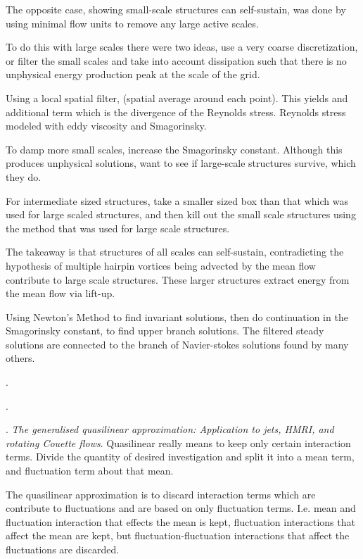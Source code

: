 \begin{description}
{\begin{description}
The opposite case, showing small-scale structures can self-sustain, was
done by using minimal flow units to remove any large active scales.

To do this with large scales there were two ideas, use a very coarse discretization, or filter the small scales and take into account dissipation such that there is no unphysical energy production peak at
the scale of the grid.

Using a local spatial filter, (spatial average around each point). This
yields and additional term which is the divergence of the Reynolds stress. Reynolds stress modeled with eddy viscosity and Smagorinsky.

To damp more small scales, increase the Smagorinsky constant. Although
this produces unphysical solutions, want to see if large-scale structures survive, which they do.

For intermediate sized structures, take a smaller sized box than that which was used for large scaled structures, and then kill out the small
scale structures using the method that was used for large scale structures.

The takeaway is that structures of all scales can self-sustain, contradicting the hypothesis of multiple hairpin vortices being advected
by the mean flow contribute to large scale structures. These larger structures extract energy from the mean flow via lift-up.

Using Newton's Method to find invariant solutions, then do continuation
in the Smagorinsky constant, to find upper branch solutions. The filtered steady solutions are connected to the branch of Navier-stokes
solutions found by many others.

\item[M. Avila Talk]
.
\item[A. Duran Talk]
.
\item[S. Tobias Talk]
.
\textit{The generalised quasilinear approximation: Application to jets,
HMRI, and rotating Couette flows}.
Quasilinear really means to keep only certain interaction terms. Divide the quantity of desired investigation and split it into a mean term, and fluctuation term about that mean.

The quasilinear approximation is to discard interaction terms which are contribute to fluctuations and are based on only fluctuation terms. I.e. mean and fluctuation interaction that effects the mean is kept, fluctuation interactions that affect the mean are kept, but fluctuation-fluctuation interactions that affect the fluctuations are discarded.


\end{description}}
\end{description}
